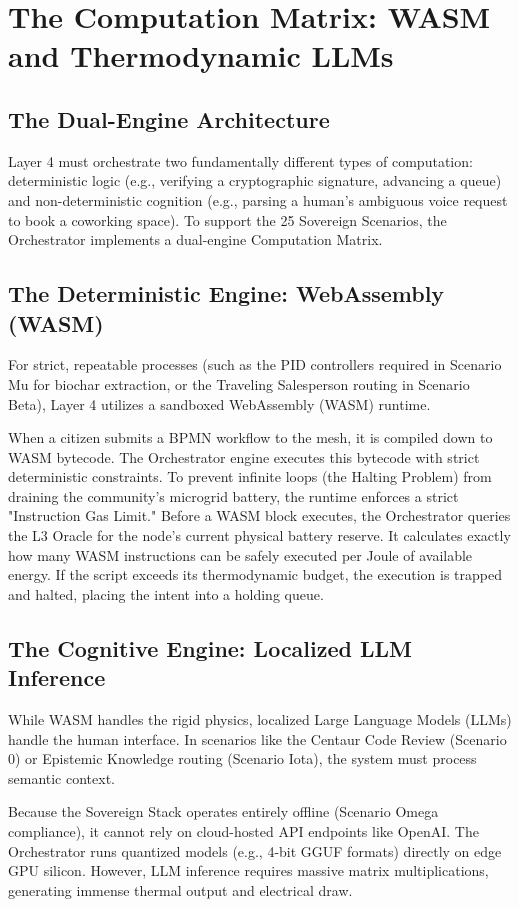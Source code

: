 \chapter{The Computation Matrix: WASM and Thermodynamic LLMs}

\section{The Dual-Engine Architecture}
Layer 4 must orchestrate two fundamentally different types of computation: deterministic logic (e.g., verifying a cryptographic signature, advancing a queue) and non-deterministic cognition (e.g., parsing a human's ambiguous voice request to book a coworking space). To support the 25 Sovereign Scenarios, the Orchestrator implements a dual-engine Computation Matrix.

\section{The Deterministic Engine: WebAssembly (WASM)}
For strict, repeatable processes (such as the PID controllers required in Scenario Mu for biochar extraction, or the Traveling Salesperson routing in Scenario Beta), Layer 4 utilizes a sandboxed WebAssembly (WASM) runtime. 

When a citizen submits a BPMN workflow to the mesh, it is compiled down to WASM bytecode. The Orchestrator engine executes this bytecode with strict deterministic constraints. To prevent infinite loops (the Halting Problem) from draining the community's microgrid battery, the runtime enforces a strict "Instruction Gas Limit." Before a WASM block executes, the Orchestrator queries the L3 Oracle for the node's current physical battery reserve. It calculates exactly how many WASM instructions can be safely executed per Joule of available energy. If the script exceeds its thermodynamic budget, the execution is trapped and halted, placing the intent into a holding queue.

\section{The Cognitive Engine: Localized LLM Inference}
While WASM handles the rigid physics, localized Large Language Models (LLMs) handle the human interface. In scenarios like the Centaur Code Review (Scenario 0) or Epistemic Knowledge routing (Scenario Iota), the system must process semantic context.

Because the Sovereign Stack operates entirely offline (Scenario Omega compliance), it cannot rely on cloud-hosted API endpoints like OpenAI. The Orchestrator runs quantized models (e.g., 4-bit GGUF formats) directly on edge GPU silicon. However, LLM inference requires massive matrix multiplications, generating immense thermal output and electrical draw.

